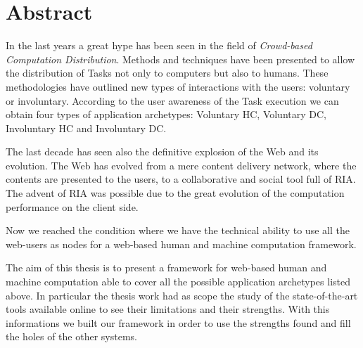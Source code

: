 \newpage
{}
\chapter*{Abstract}

In the last years a great hype has been seen in the field of \emph{Crowd-based
Computation Distribution}. Methods and techniques have been presented to allow the
distribution of Tasks not only to computers but also to humans. These
methodologies have outlined new types of interactions with the users: voluntary or involuntary. According to the user awareness of the Task execution we can obtain
four types of application archetypes: Voluntary \acl{HC}, Voluntary \acl{DC},
Involuntary \acl{HC} and Involuntary \acl{DC}.

The last decade has seen also the definitive explosion of the Web and its evolution.
The Web has evolved from a mere content delivery network, where the contents are
presented to the users, to a collaborative and social tool full of \ac{RIA}. The
advent of \ac{RIA} was possible due to the great evolution of the computation
performance on the client side.

Now we reached the condition where we have the technical ability to use all the
web-users as nodes for a web-based human and machine computation framework.

The aim of this thesis is to present a framework for web-based human and machine
computation able to cover all the possible application archetypes listed above.
In particular the thesis work had as scope the study of the state-of-the-art
tools available online to see their limitations and their strengths. With this
informations we built our framework in order to use the strengths found and fill
the holes of the other systems.


\endgroup			

\vfill

